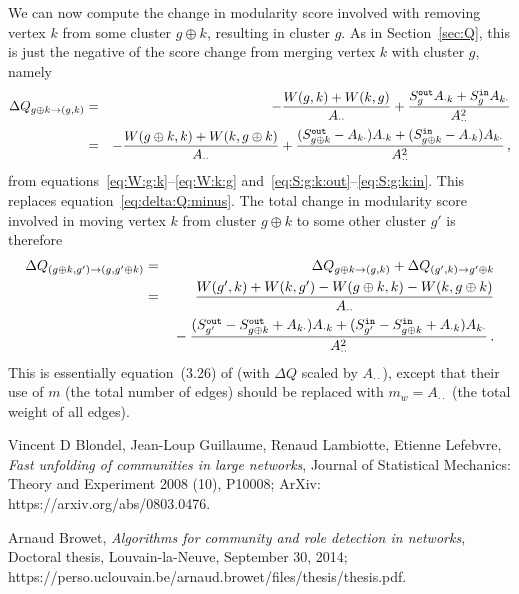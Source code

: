 \documentclass[a4paper]{article}
\begin{document}
We can now compute the change in modularity score involved with removing vertex $k$ from some cluster $g\oplus k$, resulting in cluster $g$.
As in Section~\ref{sec:Q}, this is just the negative of the score change from merging vertex $k$ with cluster $g$, namely
\begin{eqnarray}
    \Delta Q_{g\oplus k\rightarrow (g,k)} & = & 
    -\frac{W(g,k)+W(k,g)}{A_{\cdot\cdot}}+\frac{S_{g}^{\tt out}A_{\cdot k}+S_{g}^{\tt in}A_{k\cdot}}{A_{\cdot\cdot}^2}
\nonumber\\&=&    
    -\frac{W(g\oplus k,k)+W(k,g\oplus k)}{A_{\cdot\cdot}}
    +\frac{(S_{g\oplus k}^{\tt out}-A_{k\cdot})A_{\cdot k}+(S_{g\oplus k}^{\tt in}-A_{\cdot k})A_{k\cdot}}{A_{\cdot\cdot}^2}
\,,
\end{eqnarray}
from equations~\eqref{eq:W:g:k}--\eqref{eq:W:k:g} and~\eqref{eq:S:g:k:out}--\eqref{eq:S:g:k:in}. This replaces equation~\eqref{eq:delta:Q:minus}.
The total change in modularity score involved in moving vertex $k$ from cluster $g\oplus k$ to some other cluster $g'$ is therefore
\begin{eqnarray}
    \Delta Q_{(g\oplus k,g')\rightarrow(g,g'\oplus k)} & = & \Delta Q_{g\oplus k\rightarrow(g,k)} + 
    \Delta Q_{(g',k)\rightarrow g'\oplus k}
\nonumber\\
& = &
\frac{W(g',k)+W(k,g')-W(g\oplus k,k)-W(k,g\oplus k)}{A_{\cdot\cdot}}
\nonumber\\&&
{}-\frac{(S_{g'}^{\tt out}-S_{g\oplus k}^{\tt out}+A_{k\cdot})A_{\cdot k}+(S_{g'}^{\tt in}-S_{g\oplus k}^{\tt in}+A_{\cdot k})A_{k\cdot}}
{A_{\cdot\cdot}^2}
\,.
\end{eqnarray}
This is essentially equation~(3.26) of \cite{browet14} (with $\Delta Q$ scaled by $A_{\cdot\cdot}$), except that their use of $m$ 
(the total number of edges) should be
replaced with $m_w=A_{\cdot\cdot}$ (the total weight of all edges).

\begin{thebibliography}{9}

  Vincent D Blondel, Jean-Loup Guillaume, Renaud Lambiotte, Etienne Lefebvre,
  \textit{Fast unfolding of communities in large networks},
  Journal of Statistical Mechanics: Theory and Experiment 2008 (10), P10008; ArXiv: https://arxiv.org/abs/0803.0476.

  Arnaud Browet,
  \textit{Algorithms for community and role detection in networks},
  Doctoral thesis, Louvain-la-Neuve, September 30, 2014;
  https://perso.uclouvain.be/arnaud.browet/files/thesis/thesis.pdf.

\end{thebibliography}
\end{document}
